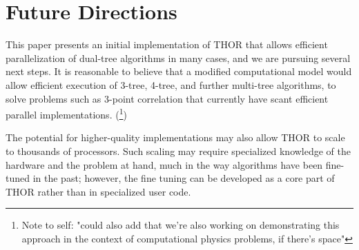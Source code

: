 \documentclass[twoside,leqno,twocolumn]{article}
\newcommand{\authornote}[1]{(\footnote{Note to self: #1})}
\newcommand{\authorsnote}[1]{\authornote{#1}}
\newcommand{\fig}[1]{Figure~\ref{fig:#1}}
\begin{document}




\section{Future Directions}

This paper presents an initial implementation of THOR that allows efficient parallelization of dual-tree algorithms in many cases, and we are pursuing several next steps.
It is reasonable to believe that a modified computational model would allow efficient execution of 3-tree, 4-tree, and further multi-tree algorithms, to solve problems such as 3-point correlation that currently have scant efficient parallel implementations.
\authorsnote{"could also add that we're also working on demonstrating this approach in the context of computational physics problems, if there's space"}

The potential for higher-quality implementations may also allow THOR to scale to thousands of processors.
Such scaling may require specialized knowledge of the hardware and the problem at hand, much in the way algorithms have been fine-tuned in the past; however, the fine tuning can be developed as a core part of THOR rather than in specialized user code.
\end{document}
